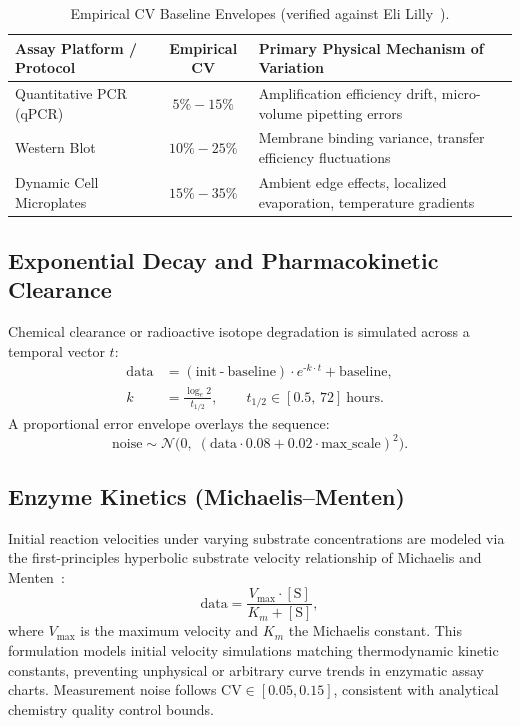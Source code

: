 \documentclass[11pt,twocolumn]{article}
\newcommand{\N}{\mathcal{N}}
\begin{document}
\begin{table}[t]
\centering
\caption{Empirical CV Baseline Envelopes (verified against Eli Lilly~\cite{lilly2012immunoassay}).}\label{tab:cv_baselines}
\small
\begin{tabularx}{\textwidth}{l c X}
\toprule
\textbf{Assay Platform / Protocol} & \textbf{Empirical CV} & \textbf{Primary Physical Mechanism of Variation} \\
\midrule
Quantitative PCR (qPCR) & $5\% - 15\%$ & Amplification efficiency drift, micro-volume pipetting errors \\
Western Blot & $10\% - 25\%$ & Membrane binding variance, transfer efficiency fluctuations \\
Dynamic Cell Microplates & $15\% - 35\%$ & Ambient edge effects, localized evaporation, temperature gradients \\
\bottomrule
\end{tabularx}
\end{table}

\subsection{Exponential Decay and Pharmacokinetic Clearance}\label{sec:decay}

Chemical clearance or radioactive isotope degradation is simulated across a temporal vector $t$:
\begin{align}
  \text{data} &= (\text{init} \mathbin{\text{-}} \text{baseline}) \cdot e^{\text{-}k \cdot t} + \text{baseline}, \label{eq:decay}\\
  k &= \frac{\log_e 2}{t_{1/2}}, \qquad t_{1/2} \in [0.5,\, 72]~\text{hours}. \label{eq:halflife}
\end{align}
A proportional error envelope overlays the sequence:
\begin{equation}\label{eq:decay_noise}
  \text{noise} \sim \N\bigl(0,\; (\text{data} \cdot 0.08 + 0.02 \cdot \text{max\_scale})^2\bigr).
\end{equation}

\subsection{Enzyme Kinetics (Michaelis--Menten)}\label{sec:mm}

Initial reaction velocities under varying substrate concentrations are modeled via the first-principles hyperbolic substrate velocity relationship of Michaelis and Menten~\cite{michaelis1913kinetik}:
\begin{equation}\label{eq:mm}
  \text{data} = \frac{V_{\max} \cdot [\text{S}]}{K_m + [\text{S}]},
\end{equation}
where $V_{\max}$ is the maximum velocity and $K_m$ the Michaelis constant. This formulation models initial velocity simulations matching thermodynamic kinetic constants, preventing unphysical or arbitrary curve trends in enzymatic assay charts. Measurement noise follows $\text{CV} \in [0.05, 0.15]$, consistent with analytical chemistry quality control bounds.
\end{document}
